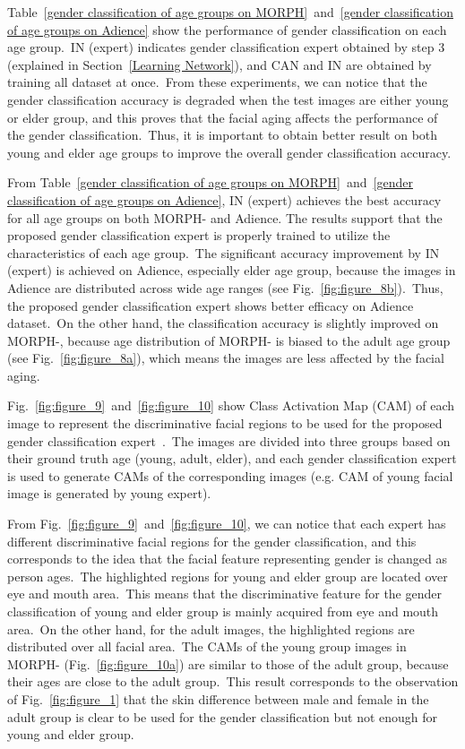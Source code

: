 \documentclass[10pt,twocolumn,letterpaper]{article}
\begin{document}
Table~\ref{gender classification of age groups on MORPH}~and~\ref{gender classification of age groups on Adience} show the performance of gender classification on each age group.~IN (expert) indicates gender classification expert obtained by step 3 (explained in Section~\ref{Learning Network}), and CAN and IN are obtained by training all dataset at once.~From these experiments, we can notice that the gender classification accuracy is degraded when the test images are either young or elder group, and this proves that the facial aging affects the performance of the gender classification.~Thus, it is important to obtain better result on both young and elder age groups to improve the overall gender classification accuracy.

From Table~\ref{gender classification of age groups on MORPH}~and~\ref{gender classification of age groups on Adience}, IN (expert) achieves the best accuracy for all age groups on both MORPH- and Adience. The results support that the proposed gender classification expert is properly trained to utilize the characteristics of each age group.~The significant accuracy improvement by IN (expert) is achieved on Adience, especially elder age group, because the images in Adience are distributed across wide age ranges (see Fig.~\ref{fig:figure_8b}).~Thus, the proposed gender classification expert shows better efficacy on Adience dataset.~On the other hand, the classification accuracy is slightly improved on MORPH-, because age distribution of MORPH- is biased to the adult age group (see Fig.~\ref{fig:figure_8a}), which means the images are less affected by the facial aging.

Fig.~\ref{fig:figure_9}~and~\ref{fig:figure_10} show Class Activation Map (CAM) of each image to represent the discriminative facial regions to be used for the proposed gender classification expert~\cite{7780688}.~The images are divided into three groups based on their ground truth age (young, adult, elder), and each gender classification expert is used to generate CAMs of the corresponding images (e.g. CAM of young facial image is generated by young expert).

From Fig.~\ref{fig:figure_9}~and~\ref{fig:figure_10}, we can notice that each expert has different discriminative facial regions for the gender classification, and this corresponds to the idea that the facial feature representing gender is changed as person ages.~The highlighted regions for young and elder group are located over eye and mouth area.~This means that the discriminative feature for the gender classification of young and elder group is mainly acquired from eye and mouth area.~On the other hand, for the adult images, the highlighted regions are distributed over all facial area.~The CAMs of the young group images in MORPH- (Fig.~\ref{fig:figure_10a}) are similar to those of the adult group, because their ages are close to the adult group.~This result corresponds to the observation of Fig.~\ref{fig:figure_1} that the skin difference between male and female in the adult group is clear to be used for the gender classification but not enough for young and elder group.
\end{document}
